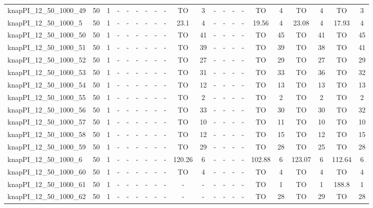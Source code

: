 \begin{sidewaystable}[!ht]
{\begin{tabular}{lcccccccccccccccccccc}
knapPI\_12\_50\_1000\_49 & 50 & 1 &  - &  - &  - &  - &  - &  - & TO & 3 &  - &  - &  - &  - & TO & 4 & TO & 4 & TO & 3 \\
knapPI\_12\_50\_1000\_5 & 50 & 1 &  - &  - &  - &  - &  - &  - & 23.1 & 4 &  - &  - &  - &  - & 19.56 & 4 & 23.08 & 4 & 17.93 & 4 \\
knapPI\_12\_50\_1000\_50 & 50 & 1 &  - &  - &  - &  - &  - &  - & TO & 41 &  - &  - &  - &  - & TO & 45 & TO & 41 & TO & 45 \\
knapPI\_12\_50\_1000\_51 & 50 & 1 &  - &  - &  - &  - &  - &  - & TO & 39 &  - &  - &  - &  - & TO & 39 & TO & 38 & TO & 41 \\
knapPI\_12\_50\_1000\_52 & 50 & 1 &  - &  - &  - &  - &  - &  - & TO & 27 &  - &  - &  - &  - & TO & 29 & TO & 27 & TO & 29 \\
knapPI\_12\_50\_1000\_53 & 50 & 1 &  - &  - &  - &  - &  - &  - & TO & 31 &  - &  - &  - &  - & TO & 33 & TO & 36 & TO & 32 \\
knapPI\_12\_50\_1000\_54 & 50 & 1 &  - &  - &  - &  - &  - &  - & TO & 12 &  - &  - &  - &  - & TO & 13 & TO & 13 & TO & 13 \\
knapPI\_12\_50\_1000\_55 & 50 & 1 &  - &  - &  - &  - &  - &  - & TO & 2 &  - &  - &  - &  - & TO & 2 & TO & 2 & TO & 2 \\
knapPI\_12\_50\_1000\_56 & 50 & 1 &  - &  - &  - &  - &  - &  - & TO & 33 &  - &  - &  - &  - & TO & 30 & TO & 30 & TO & 32 \\
knapPI\_12\_50\_1000\_57 & 50 & 1 &  - &  - &  - &  - &  - &  - & TO & 10 &  - &  - &  - &  - & TO & 11 & TO & 10 & TO & 10 \\
knapPI\_12\_50\_1000\_58 & 50 & 1 &  - &  - &  - &  - &  - &  - & TO & 12 &  - &  - &  - &  - & TO & 15 & TO & 12 & TO & 15 \\
knapPI\_12\_50\_1000\_59 & 50 & 1 &  - &  - &  - &  - &  - &  - & TO & 29 &  - &  - &  - &  - & TO & 28 & TO & 25 & TO & 28 \\
knapPI\_12\_50\_1000\_6 & 50 & 1 &  - &  - &  - &  - &  - &  - & 120.26 & 6 &  - &  - &  - &  - & 102.88 & 6 & 123.07 & 6 & 112.64 & 6 \\
knapPI\_12\_50\_1000\_60 & 50 & 1 &  - &  - &  - &  - &  - &  - & TO & 4 &  - &  - &  - &  - & TO & 4 & TO & 4 & TO & 4 \\
knapPI\_12\_50\_1000\_61 & 50 & 1 &  - &  - &  - &  - &  - &  - &  - &  - &  - &  - &  - &  - & TO & 1 & TO & 1 & 188.8 & 1 \\
knapPI\_12\_50\_1000\_62 & 50 & 1 &  - &  - &  - &  - &  - &  - &  - &  - &  - &  - &  - &  - & TO & 28 & TO & 29 & TO & 28 \\

\end{tabular}}
\end{sidewaystable}
